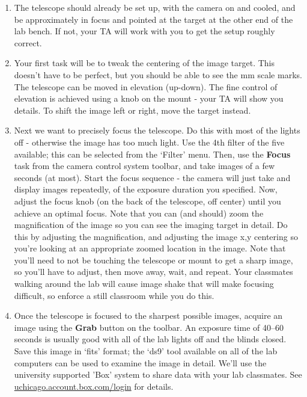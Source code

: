 \begin{enumerate}
	\item The telescope should already be set up, with the camera on and cooled, and be approximately
	in focus and pointed at the target at the other end of the lab bench. If not, your TA will
	work with you to get the setup roughly correct.
	
	\item Your first task will be to tweak the centering of the image target. This doesn’t have to be
	perfect, but you should be able to see the mm scale marks. The telescope can be moved in elevation (up-down). The fine control of elevation is achieved using a knob on the mount - your TA will show you details. To shift the image left or right, move the target instead.
	
	\item Next we want to precisely focus the telescope. Do this with most of the lights off - otherwise
	the image has too much light. Use the 4th filter of the five available; this can be selected
	from the ‘Filter’ menu. Then, use the \textbf{Focus} task from the camera control system toolbar,
	and take images of a few seconds (at most). Start the focus sequence - the camera will just
	take and display images repeatedly, of the exposure duration you specified. Now, adjust
	the focus knob (on the back of the telescope, off center) until you achieve an optimal focus.
	Note that you can (and should) zoom the magnification of the image so you can see the
	imaging target in detail. Do this by adjusting the magnification, and adjusting the image
	x,y centering so you’re looking at an appropriate zoomed location in the image. Note that
	you’ll need to not be touching the telescope or mount to get a sharp image, so you’ll
	have to adjust, then move away, wait, and repeat. Your classmates walking around the lab
	will cause image shake that will make focusing difficult, so enforce a still classroom while
	you do this.
	
	\item Once the telescope is focused to the sharpest possible images, acquire an image using the
	\textbf{Grab} button on the toolbar. An exposure time of 40--60 seconds is usually good with all of
	the lab lights off and the blinds closed. Save this image in ‘fits’ format; the ‘ds9’ tool available on all of the lab
	computers can be used to examine the image in detail. We’ll use the university supported
	’Box’ system to share data with your lab classmates. See \url{uchicago.account.box.com/login}
	for details.
	

\end{enumerate}
